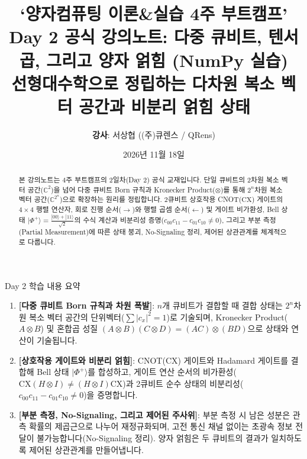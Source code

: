 \documentclass[11pt, a4paper]{article}
\title{\textbf{\Huge `양자컴퓨팅 이론\&실습 4주 부트캠프'}\\[0.4em]
\LARGE Day 2 공식 강의노트: 다중 큐비트, 텐서곱, 그리고 양자 얽힘 (NumPy 실습)\\[0.2em]
\large 선형대수학으로 정립하는 다차원 복소 벡터 공간과 비분리 얽힘 상태}
\author{\textbf{강사}: 서상협 ((주)큐렌스 / QRens)}
\date{2026년 11월 18일}
\newcommand{\ket}[1]{|#1\rangle}
\theoremstyle{definition}
\begin{document}
\maketitle

\begin{abstract}
본 강의노트는 4주 부트캠프의 2일차(Day 2) 공식 교재입니다. 단일 큐비트의 2차원 복소 벡터 공간($\mathbb{C}^2$)을 넘어 다중 큐비트 Born 규칙과 Kronecker Product($\otimes$)를 통해 $2^n$차원 복소 벡터 공간($\mathbb{C}^{2^n}$)으로 확장하는 원리를 정립합니다. 2큐비트 상호작용 CNOT($\mathrm{CX}$) 게이트의 $4 \times 4$ 행렬 연산자, 회로 진행 순서($\to$)와 행렬 곱셈 순서($\leftarrow$) 및 게이트 비가환성, Bell 상태 $\ket{\Phi^+} = \frac{\ket{00}+\ket{11}}{\sqrt{2}}$의 수식 계산과 비분리성 증명($c_{00}c_{11}-c_{01}c_{10} \neq 0$), 그리고 부분 측정(Partial Measurement)에 따른 상태 붕괴, No-Signaling 정리, 제어된 상관관계를 체계적으로 다룹니다.
\end{abstract}

\vspace{0.3cm}

\begin{notebox}{Day 2 학습 내용 요약}
\begin{enumerate}
    \item \textbf{[다중 큐비트 Born 규칙과 차원 폭발]}: $n$개 큐비트가 결합할 때 결합 상태는 $2^n$차원 복소 벡터 공간의 단위벡터($\sum |c_x|^2 = 1$)로 기술되며, Kronecker Product($A \otimes B$) 및 혼합곱 성질 $(A \otimes B)(C \otimes D) = (AC) \otimes (BD)$으로 상태와 연산이 기술됩니다.
    \item \textbf{[상호작용 게이트와 비분리 얽힘]}: CNOT($\mathrm{CX}$) 게이트와 Hadamard 게이트를 결합해 Bell 상태 $\ket{\Phi^+}$를 합성하고, 게이트 연산 순서의 비가환성($\mathrm{CX}(H \otimes I) \neq (H \otimes I)\mathrm{CX}$)과 2큐비트 순수 상태의 비분리성($c_{00}c_{11} - c_{01}c_{10} \neq 0$)을 증명합니다.
    \item \textbf{[부분 측정, No-Signaling, 그리고 제어된 주사위]}: 부분 측정 시 남은 성분은 관측 확률의 제곱근으로 나누어 재정규화되며, 고전 통신 채널 없이는 초광속 정보 전달이 불가능합니다(No-Signaling 정리). 양자 얽힘은 두 큐비트의 결과가 일치하도록 제어된 상관관계를 만들어냅니다.
\end{enumerate}
\end{notebox}

\end{document}
